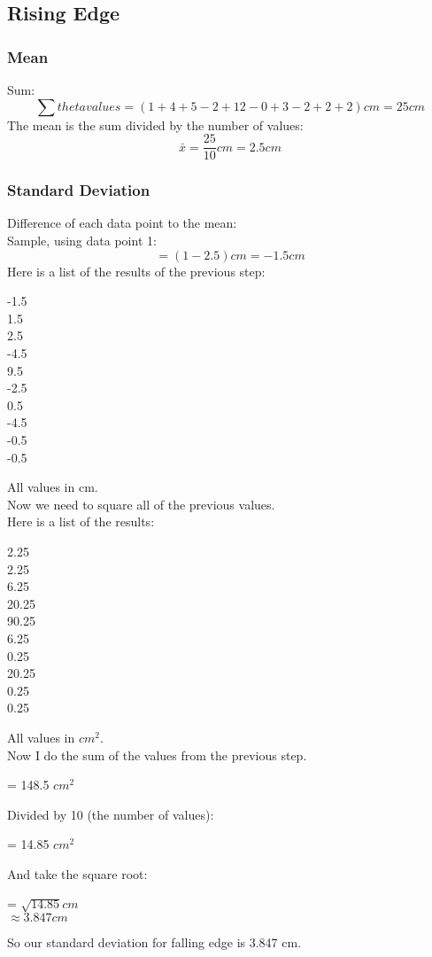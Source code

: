 \documentclass[letterpaper,12pt]{article}
\begin{document}
{\subsection{Rising Edge}
\subsubsection{Mean}
Sum:
\begin{equation}
\sum{theta values} = (1+4+5-2+12-0+3-2+2+2) cm = 25 cm
\end{equation}
The mean is the sum divided by the number of values:
\begin{equation}
\bar{x} = \frac{25}{10} cm = 2.5 cm
\end{equation}
\subsubsection{Standard Deviation}
Difference of each data point to the mean:\\
Sample, using data point 1:\\
\begin{equation}
=(1-2.5) cm = -1.5 cm
\end{equation}
Here is a list of the results of the previous step:
\begin{center}
-1.5 \\
1.5 \\
2.5 \\
-4.5 \\
9.5 \\
-2.5 \\
0.5 \\
-4.5 \\
-0.5 \\
-0.5 \\
\end{center}
All values in cm.\\
Now we need to square all of the previous values.\\
Here is a list of the results:
\begin{center}
2.25 \\
2.25 \\
6.25 \\
20.25 \\
90.25 \\
6.25 \\
0.25 \\
20.25 \\
0.25 \\
0.25 \\
\end{center}
All values in $cm^{2}$.\\
Now I do the sum of the values from the previous step.
\begin{center}
= 148.5 $cm^{2}$
\end{center}
Divided by 10 (the number of values):
\begin{center}
= 14.85 $cm^{2}$
\end{center}
And take the square root: 
\begin{center}
= $\sqrt{14.85} cm$\\
$\approx 3.847 cm$
\end{center}
So our standard deviation for falling edge is 3.847 cm.
}
\end{document}
